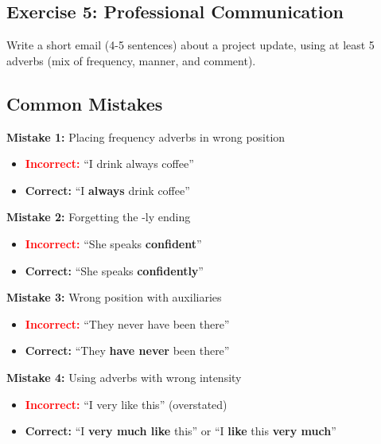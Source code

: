 \subsection{Exercise 5: Professional Communication}
Write a short email (4-5 sentences) about a project update, using at least 5 adverbs (mix of frequency, manner, and comment).

\begin{tcolorbox}[colback=white,height=6cm]
\end{tcolorbox}

\subsection{Common Mistakes}

\begin{tcolorbox}[colback=red!5, colframe=red!30, title=Common Adverb Errors]
\textbf{Mistake 1:} Placing frequency adverbs in wrong position
\begin{itemize}
    \item \textcolor{red}{\textbf{Incorrect:}} ``I drink always coffee''
    \item \textcolor{green!60!black}{\textbf{Correct:}} ``I \textbf{always} drink coffee''
\end{itemize}

\textbf{Mistake 2:} Forgetting the -ly ending
\begin{itemize}
    \item \textcolor{red}{\textbf{Incorrect:}} ``She speaks \textbf{confident}''
    \item \textcolor{green!60!black}{\textbf{Correct:}} ``She speaks \textbf{confidently}''
\end{itemize}

\textbf{Mistake 3:} Wrong position with auxiliaries
\begin{itemize}
    \item \textcolor{red}{\textbf{Incorrect:}} ``They never have been there''
    \item \textcolor{green!60!black}{\textbf{Correct:}} ``They \textbf{have never} been there''
\end{itemize}

\textbf{Mistake 4:} Using adverbs with wrong intensity
\begin{itemize}
    \item \textcolor{red}{\textbf{Incorrect:}} ``I very like this'' (overstated)
    \item \textcolor{green!60!black}{\textbf{Correct:}} ``I \textbf{very much like} this'' or ``I \textbf{like} this \textbf{very much}''
\end{itemize}
\end{tcolorbox}

